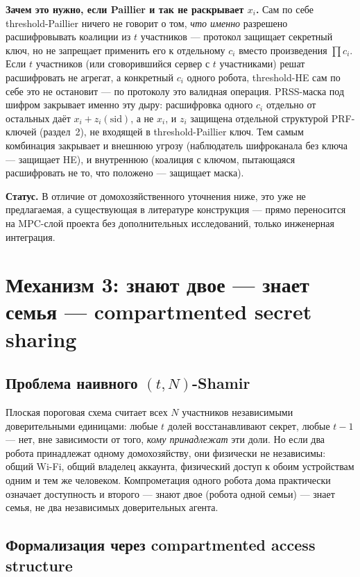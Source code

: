 \documentclass[11pt]{article}
\begin{document}
\textbf{Зачем это нужно, если Paillier и так не раскрывает $x_i$.} Сам по себе
threshold-Paillier ничего не говорит о том, \emph{что именно} разрешено
расшифровывать коалиции из $t$ участников — протокол защищает секретный ключ, но не
запрещает применить его к отдельному $c_i$ вместо произведения $\prod c_i$. Если
$t$ участников (или сговорившийся сервер с $t$ участниками) решат расшифровать не
агрегат, а конкретный $c_i$ одного робота, threshold-HE сам по себе это не
остановит — по протоколу это валидная операция. PRSS-маска под шифром закрывает
именно эту дыру: расшифровка одного $c_i$ отдельно от остальных даёт
$x_i+z_i(\mathrm{sid})$, а не $x_i$, и $z_i$ защищена отдельной структурой PRF-ключей
(раздел~2), не входящей в threshold-Paillier ключ. Тем самым комбинация закрывает
и внешнюю угрозу (наблюдатель шифроканала без ключа — защищает HE), и внутреннюю
(коалиция с ключом, пытающаяся расшифровать не то, что положено — защищает маска).

\textbf{Статус.} В отличие от домохозяйственного уточнения ниже, это уже не
предлагаемая, а существующая в литературе конструкция — прямо переносится на MPC-слой
проекта без дополнительных исследований, только инженерная интеграция.

\section{Механизм 3: \guillemotleft знают двое — знает семья\guillemotright{} —
compartmented secret sharing}

\subsection*{Проблема наивного $(t,N)$-Shamir}

Плоская пороговая схема считает всех $N$ участников независимыми доверительными
единицами: любые $t$ долей восстанавливают секрет, любые $t-1$ — нет, вне
зависимости от того, \emph{кому принадлежат} эти доли. Но если два робота
принадлежат одному домохозяйству, они физически не независимы: общий Wi-Fi, общий
владелец аккаунта, физический доступ к обоим устройствам одним и тем же человеком.
Компрометация одного робота дома практически означает доступность и второго —
\guillemotleft знают двое (робота одной семьи) — знает семья\guillemotright,
не два независимых доверительных агента.

\subsection*{Формализация через compartmented access structure}
\end{document}
